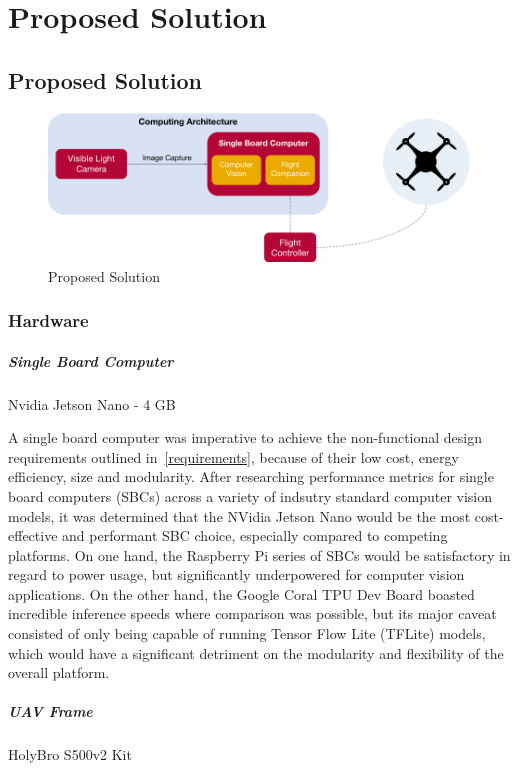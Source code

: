 \chapter{Proposed Solution}
\section{Proposed Solution}
\begin{figure}[h]
\centering
\includegraphics[width=1\linewidth]{assets/proposed-solution.png}
\caption{Proposed Solution}
\label{proposed_solution}
\end{figure}
\subsection{Hardware}
\paragraph{Single Board Computer} Nvidia Jetson Nano - 4 GB

A single board computer was imperative to achieve the non-functional design requirements outlined in~\ref{requirements}, because of their low cost, energy efficiency, size and modularity. After researching performance metrics for single board computers (SBCs) across a variety of indsutry standard computer vision models, it was determined that the NVidia Jetson Nano would be the most cost-effective and performant SBC choice, especially compared to competing platforms. On one hand, the Raspberry Pi series of SBCs would be satisfactory in regard to power usage, but significantly underpowered for computer vision applications. On the other hand, the Google Coral TPU Dev Board boasted incredible inference speeds where comparison was possible, but its major caveat consisted of only being capable of running Tensor Flow Lite (TFLite) models, which would have a significant detriment on the modularity and flexibility of the overall platform.

\paragraph{UAV Frame} HolyBro S500v2 Kit

